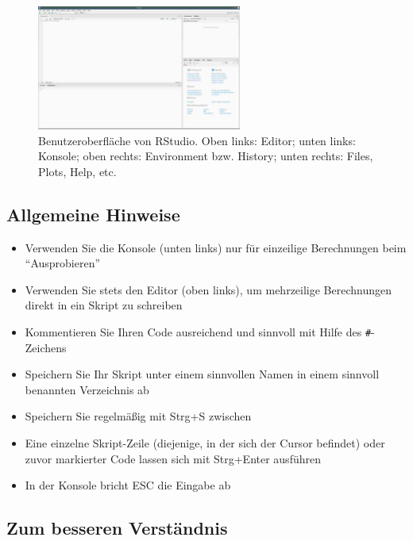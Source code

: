 \documentclass[
]{book}
\providecommand{\tightlist}{%
  \setlength{\itemsep}{0pt}\setlength{\parskip}{0pt}}
\begin{document}
\begin{figure}
\centering
\includegraphics[width=0.6\textwidth,height=\textheight]{imgs/RStudio_003.jpg}
\caption{Benutzeroberfläche von RStudio. Oben links: Editor; unten links: Konsole; oben rechts: Environment bzw. History; unten rechts: Files, Plots, Help, etc.}
\end{figure}

\hypertarget{allgemeine-hinweise}{%
\subsection*{Allgemeine Hinweise}\label{allgemeine-hinweise}}

\begin{itemize}
\tightlist
\item
  Verwenden Sie die Konsole (unten links) nur für einzeilige Berechnungen beim ``Ausprobieren''
\item
  Verwenden Sie stets den Editor (oben links), um mehrzeilige Berechnungen direkt in ein Skript zu schreiben
\item
  Kommentieren Sie Ihren Code ausreichend und sinnvoll mit Hilfe des \texttt{\#}-Zeichens
\item
  Speichern Sie Ihr Skript unter einem sinnvollen Namen in einem sinnvoll benannten Verzeichnis ab
\end{itemize}

\begin{itemize}
\tightlist
\item
  Speichern Sie regelmäßig mit Strg+S zwischen
\item
  Eine einzelne Skript-Zeile (diejenige, in der sich der Cursor befindet) oder zuvor markierter Code lassen sich mit Strg+Enter ausführen
\item
  In der Konsole bricht ESC die Eingabe ab
\end{itemize}

\hypertarget{zum-besseren-verstuxe4ndnis}{%
\subsection*{Zum besseren Verständnis}\label{zum-besseren-verstuxe4ndnis}}
\end{document}
